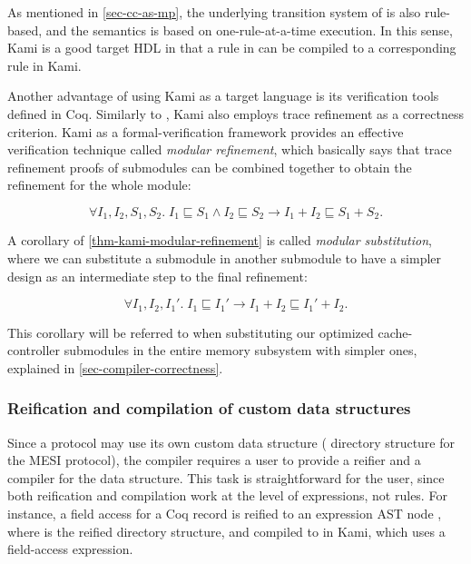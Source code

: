As mentioned in \autoref{sec-cc-as-mp}, the underlying transition system of \hemiola{} is also rule-based, and the semantics is based on one-rule-at-a-time execution.
In this sense, Kami is a good target HDL in that a rule in \hemiola{} can be compiled to a corresponding rule in Kami.

Another advantage of using Kami as a target language is its verification tools defined in Coq.
Similarly to \hemiola{}, Kami also employs trace refinement as a correctness criterion.
Kami as a formal-verification framework provides an effective verification technique called \emph{modular refinement}, which basically says that trace refinement proofs of submodules can be combined together to obtain the refinement for the whole module:
\begin{theorem}
  \label{thm-kami-modular-refinement}
  \begin{displaymath}
    \forall I_1, I_2, S_1, S_2.\; I_1 \sqsubseteq S_1 \wedge I_2 \sqsubseteq S_2 \to I_1 + I_2 \sqsubseteq S_1 + S_2.
  \end{displaymath}
\end{theorem}

A corollary of \autoref{thm-kami-modular-refinement} is called \emph{modular substitution}, where we can substitute a submodule in another submodule to have a simpler design as an intermediate step to the final refinement:
\begin{theorem}
  \label{thm-kami-modular-subst}
  \begin{displaymath}
    \forall I_1, I_2, I_1'.\; I_1 \sqsubseteq I_1' \to I_1 + I_2 \sqsubseteq I_1' + I_2.
  \end{displaymath}
\end{theorem}
This corollary will be referred to when substituting our optimized cache-controller submodules in the entire memory subsystem with simpler ones, explained in \autoref{sec-compiler-correctness}.

\subsubsection{Reification and compilation of custom data structures}

Since a \hemiola{} protocol may use its own custom data structure (\eg{} directory structure for the MESI protocol), the compiler requires a user to provide a reifier and a compiler for the data structure.
This task is straightforward for the user, since both reification and compilation work at the level of expressions, not rules.
For instance, a field access  for a Coq record  is reified to an expression AST node , where  is the reified directory structure, and compiled to  in Kami, which uses a field-access expression.

